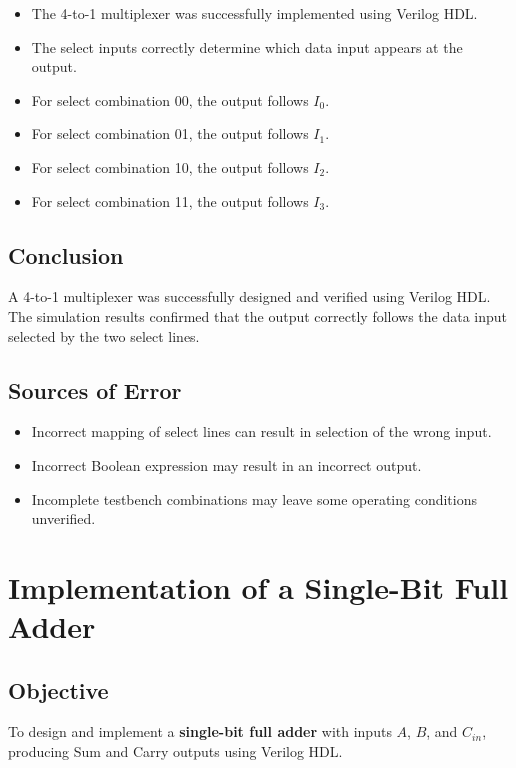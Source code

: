 \documentclass[12pt,a4paper]{report}
\begin{document}
\begin{itemize}
    \item The 4-to-1 multiplexer was successfully implemented using Verilog HDL.
    \item The select inputs correctly determine which data input appears at the output.
    \item For select combination 00, the output follows $I_0$.
    \item For select combination 01, the output follows $I_1$.
    \item For select combination 10, the output follows $I_2$.
    \item For select combination 11, the output follows $I_3$.
\end{itemize}

\section{Conclusion}

A 4-to-1 multiplexer was successfully designed and verified using Verilog HDL. The simulation results confirmed that the output correctly follows the data input selected by the two select lines.

\section{Sources of Error}

\begin{itemize}
    \item Incorrect mapping of select lines can result in selection of the wrong input.
    \item Incorrect Boolean expression may result in an incorrect output.
    \item Incomplete testbench combinations may leave some operating conditions unverified.
\end{itemize}


\chapter{Implementation of a Single-Bit Full Adder}
\label{ch:pdf3}

\section{Objective}

To design and implement a \textbf{single-bit full adder} with inputs $A$, $B$, and $C_{in}$, producing Sum and Carry outputs using Verilog HDL.
\end{document}
